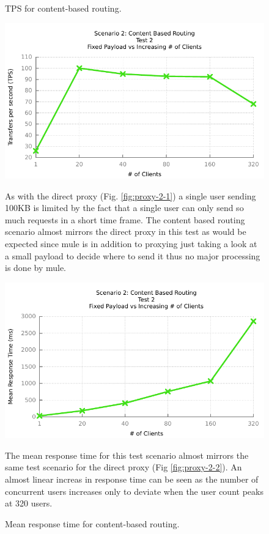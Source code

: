 \begin{figure}[H]
	\caption{TPS for content-based routing.}
	\centerline{\includegraphics{img/mediation_fp_iu_tps}}
	\label{fig:mediation-2-1}
	As with the direct proxy (Fig. \ref{fig:proxy-2-1}) a single user sending 100KB is limited by the fact that a single user can only send so much requests in a short time frame. The content based routing scenario almost mirrors the direct proxy in this test as would be expected since mule is in addition to proxying just taking a look at a small payload to decide where to send it thus no major processing is done by mule.

	\caption{Mean response time for content-based routing.}
	\centerline{\includegraphics{img/mediation_fp_iu_resp}}
	\label{fig:mediation-2-2}
	The mean response time for this test scenario almost mirrors the same test scenario for the direct proxy (Fig \ref{fig:proxy-2-2}). An almost linear increas in response time can be seen as the number of concurrent users increases only to deviate when the user count peaks at 320 users.
\end{figure}

